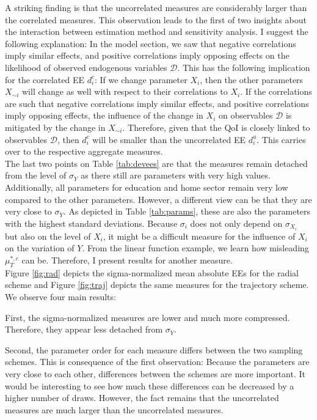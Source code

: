\noindent
A striking finding is that the uncorrelated measures are considerably larger than the correlated measures. This observation leads to the first of two insights about the interaction between estimation method and sensitivity analysis. I suggest the following explanation: In the model section, we saw that negative correlations imply similar effects, and positive correlations imply opposing effects on the likelihood of observed endogenous variables $\pmb{\mathcal{D}}$. This has the following implication for the correlated EE $d_i^{c}$: If we change parameter $X_i$, then the other parameters $X_{\sim i}$ will change as well with respect to their correlations to $X_i$. If the correlations are such that negative correlations imply similar effects, and positive correlations imply opposing effects, the influence of the change in $X_i$ on observables $\pmb{\mathcal{D}}$ is mitigated by the change in $X_{\sim i}$. Therefore, given that the QoI is closely linked to observables $\pmb{\mathcal{D}}$, then $d_i^{c}$ will be smaller than the uncorrelated EE $d_i^{u}$. This carries over to the respective aggregate measures.\\

\noindent
The last two points on Table \ref{tab:devees} are that the measures remain detached from the level of $\sigma_Y$ as there still are parameters with very high values. Additionally, all parameters for education and home sector remain very low compared to the other parameters. However, a different view can be that they are very close to $\sigma_Y$. As depicted in Table \ref{tab:params}, these are also the parameters with the highest standard deviations. Because $\sigma_i$ does not only depend on $\sigma_{X_i}$ but also on the level of $X_i$, it might be a difficult measure for the influence of $X_i$ on the variation of $Y$. From the linear function example, we learn how misleading $\mu^{*,c}_T$ can be. Therefore, I present results for another measure.\\


\noindent
Figure \ref{fig:rad} depicts the sigma-normalized mean absolute EEs for the radial scheme and Figure \ref{fig:traj} depicts the same measures for the trajectory scheme. We observe four main results:


First, the sigma-normalized measures are lower and much more compressed. Therefore, they appear less detached from $\sigma_Y$.

Second, the parameter order for each measure differs between the two sampling schemes. This is consequence of the first observation: Because the parameters are very close to each other, differences between the schemes are more important. It would be interesting to see how much these differences can be decreased by a higher number of draws. However, the fact remains that the uncorrelated measures are much larger than the uncorrelated measures.

